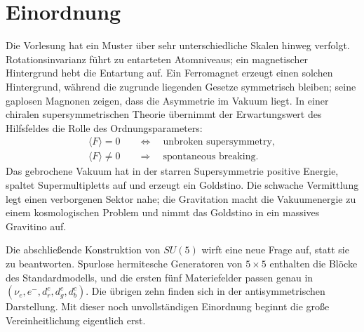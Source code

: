\section{Einordnung}

Die Vorlesung hat ein Muster über sehr unterschiedliche Skalen hinweg verfolgt. Rotationsinvarianz führt zu entarteten Atomniveaus; ein magnetischer Hintergrund hebt die Entartung auf. Ein Ferromagnet erzeugt einen solchen Hintergrund, während die zugrunde liegenden Gesetze symmetrisch bleiben; seine gaplosen Magnonen zeigen, dass die Asymmetrie im Vakuum liegt. In einer chiralen supersymmetrischen Theorie übernimmt der Erwartungswert des Hilfsfeldes die Rolle des Ordnungsparameters:
\begin{equation}
\begin{aligned}
\langle F\rangle=0
&\quad\Longleftrightarrow\quad
\text{unbroken supersymmetry},\\
\langle F\rangle\neq0
&\quad\Longrightarrow\quad
\text{spontaneous breaking}.
\end{aligned}
\end{equation}
Das gebrochene Vakuum hat in der starren Supersymmetrie positive Energie, spaltet Supermultipletts auf und erzeugt ein Goldstino. Die schwache Vermittlung legt einen verborgenen Sektor nahe; die Gravitation macht die Vakuumenergie zu einem kosmologischen Problem und nimmt das Goldstino in ein massives Gravitino auf.

Die abschließende Konstruktion von \(SU(5)\) wirft eine neue Frage auf, statt sie zu beantworten. Spurlose hermitesche Generatoren von \(5\times5\) enthalten die Blöcke des Standardmodells, und die ersten fünf Materiefelder passen genau in
\((\nu_e,e^-,d^c_r,d^c_g,d^c_b)\). Die übrigen zehn finden sich in der antisymmetrischen Darstellung. Mit dieser noch unvollständigen Einordnung beginnt die große Vereinheitlichung eigentlich erst.
